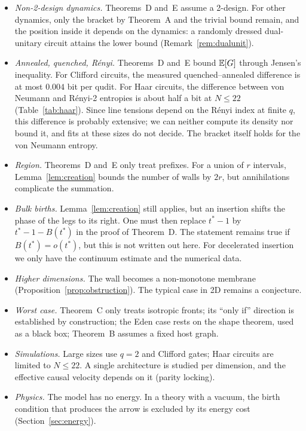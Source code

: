 \begin{itemize}[leftmargin=*,itemsep=1pt]
\item \emph{Non-2-design dynamics.} Theorems~D and~E assume a 2-design. For other dynamics, only the bracket by Theorem~A and the trivial bound remain, and the position inside it depends on the dynamics: a randomly dressed dual-unitary circuit attains the lower bound (Remark~\ref{rem:dualunit}).
\item \emph{Annealed, quenched, R\'enyi.} Theorems~D and~E bound $\mathbb{E}[G]$ through Jensen's inequality. For Clifford circuits, the measured quenched--annealed difference is at most $0.004$ bit per qudit. For Haar circuits, the difference between von Neumann and R\'enyi-2 entropies is about half a bit at $N\le22$ (Table~\ref{tab:haar}). Since line tensions depend on the R\'enyi index at finite $q$, this difference is probably extensive; we can neither compute its density nor bound it, and fits at these sizes do not decide. The bracket itself holds for the von Neumann entropy.
\item \emph{Region.} Theorems~D and~E only treat prefixes. For a union of $r$ intervals, Lemma~\ref{lem:creation} bounds the number of walls by $2r$, but annihilations complicate the summation.
\item \emph{Bulk births.} Lemma~\ref{lem:creation} still applies, but an insertion shifts the phase of the legs to its right. One must then replace $t^\ast-1$ by $t^\ast-1-B(t^\ast)$ in the proof of Theorem~D. The statement remains true if $B(t^\ast)=o(t^\ast)$, but this is not written out here. For decelerated insertion we only have the continuum estimate and the numerical data.
\item \emph{Higher dimensions.} The wall becomes a non-monotone membrane (Proposition~\ref{prop:obstruction}). The typical case in 2D remains a conjecture.
\item \emph{Worst case.} Theorem~C only treats isotropic fronts; its ``only if'' direction is established by construction; the Eden case rests on the shape theorem, used as a black box; Theorem~B assumes a fixed host graph.
\item \emph{Simulations.} Large sizes use $q=2$ and Clifford gates; Haar circuits are limited to $N\le22$. A single architecture is studied per dimension, and the effective causal velocity depends on it (parity locking).
\item \emph{Physics.} The model has no energy. In a theory with a vacuum, the birth condition that produces the arrow is excluded by its energy cost (Section~\ref{sec:energy}).
\end{itemize}

